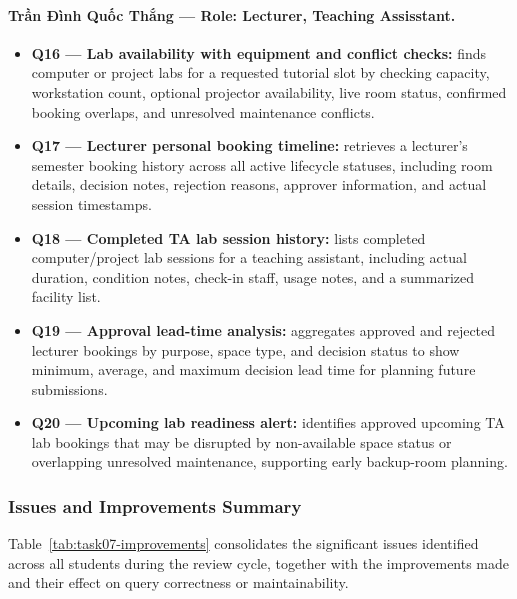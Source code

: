 \paragraph{Trần Đình Quốc Thắng --- Role: Lecturer, Teaching Assisstant.}
\begin{itemize}[noitemsep]
    \item \textbf{Q16 --- Lab availability with equipment and conflict checks:}
    finds computer or project labs for a requested tutorial slot by checking
    capacity, workstation count, optional projector availability, live room
    status, confirmed booking overlaps, and unresolved maintenance conflicts.

    \item \textbf{Q17 --- Lecturer personal booking timeline:} retrieves a
    lecturer's semester booking history across all active lifecycle statuses,
    including room details, decision notes, rejection reasons, approver
    information, and actual session timestamps.

    \item \textbf{Q18 --- Completed TA lab session history:} lists completed
    computer/project lab sessions for a teaching assistant, including actual
    duration, condition notes, check-in staff, usage notes, and a summarized
    facility list.

    \item \textbf{Q19 --- Approval lead-time analysis:} aggregates approved
    and rejected lecturer bookings by purpose, space type, and decision status
    to show minimum, average, and maximum decision lead time for planning
    future submissions.

    \item \textbf{Q20 --- Upcoming lab readiness alert:} identifies approved
    upcoming TA lab bookings that may be disrupted by non-available space
    status or overlapping unresolved maintenance, supporting early backup-room
    planning.
\end{itemize}

\subsubsection{Issues and Improvements Summary}

Table~\ref{tab:task07-improvements} consolidates the significant issues
identified across all students during the review cycle, together with the
improvements made and their effect on query correctness or maintainability.

